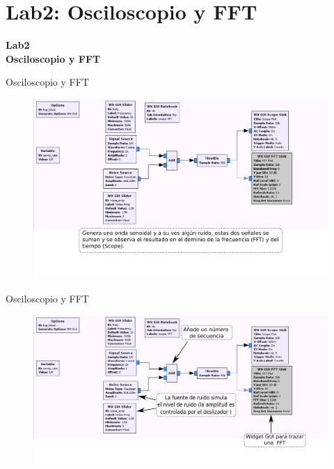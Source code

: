\section{Lab2: Osciloscopio y FFT}
\begin{frame}{}


\bfseries{\textrm{\LARGE Lab2\\ \Large Osciloscopio y FFT}}
\raggedright
\end{frame}

\begin{frame}{Osciloscopio y FFT}


\begin{figure}[H]
\vspace{-4mm}
\centering
\includegraphics[width=1.2\textwidth]{lab2/pdf/lab2_1.pdf}
\end{figure}
\end{frame}

\begin{frame}{Osciloscopio y FFT}
\begin{figure}[H]
\vspace{-4mm}
\centering
\includegraphics[width=1.1\textwidth]{lab2/pdf/lab2_2.pdf}
\end{figure}
\end{frame}

